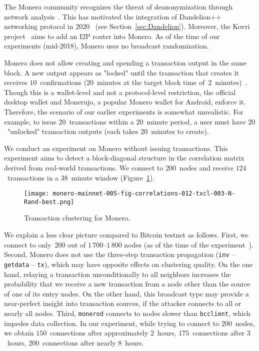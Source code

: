 The Monero community recognizes the threat of deanonymization through network analysis~\cite{user36432017, manontheinside2016, expez2016, Cameron2016}.
This has motivated the integration of Dandelion++ networking protocol in 2020~\cite{ErCiccione2020} (see Section~\ref{sec:Dandelion}).
Moreover, the Kovri project~\cite{Kovri} aims to add an I2P router into Monero.
As of the time of our experiments (mid-2018), Monero uses no broadcast randomization.

Monero does not allow creating and spending a transaction output in the same block.
A new output appears as "locked" until the transaction that creates it receives $10$~confirmations ($20$~minutes at the target block time of~$2$~minutes)~\cite{dpzz2017}.
Though this is a wallet-level and not a protocol-level restriction, the official desktop wallet and Monerujo, a popular Monero wallet for Android, enforce it.
Therefore, the scenario of our earlier experiments is somewhat unrealistic.
For example, to issue $20$~transactions within a $20$~minute period, a user must have $20$~"unlocked" transaction outputs (each takes $20$~minutes to create).

We conduct an experiment on Monero without issuing transactions.
This experiment aims to detect a block-diagonal structure in the correlation matrix derived from real-world transactions.
We connect to $200$~nodes and receive $124$~transactions in a $38$~minute window (Figure~\ref{fig:monero}).

\begin{figure}[!t]
	\centering
	\texttt{[image: monero-mainnet-005-fig-correlations-012-txcl-003-N-Rand-best.png]}
	\caption{Transaction clustering for Monero.}
	\label{fig:monero}
\end{figure}

We explain a less clear picture compared to Bitcoin testnet as follows.
First, we connect to only~$200$ out of $1\,700$--$1\,800$ nodes (as of the time of the experiment~\cite{MoneroHash}).
Second, Monero does not use the three-step transaction propagation (\texttt{inv} -- \texttt{getdata} -- \texttt{tx}), which may have opposite effects on clustering quality.
On the one hand, relaying a transaction unconditionally to all neighbors increases the probability that we receive a new transaction from a node other than the source of one of its entry nodes.
On the other hand, this broadcast type may provide a near-perfect insight into transaction sources, if the attacker connects to all or nearly all nodes.
Third, \texttt{monerod} connects to nodes slower than \texttt{bcclient}, which impedes data collection.
In our experiment, while trying to connect to $200$~nodes, we obtain $150$~connections after approximately $2$~hours, $175$~connections after $3$~hours, $200$~connections after nearly $8$~hours.

